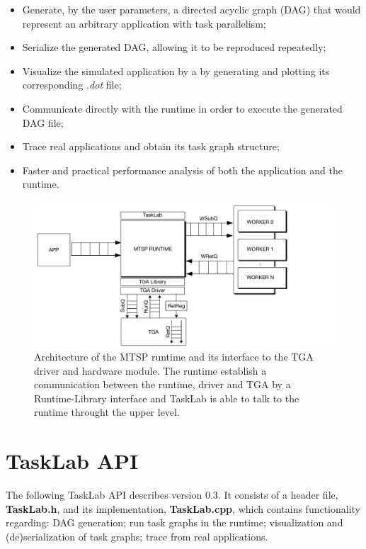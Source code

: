 \begin{itemize}
\item Generate, by the user parameters, a directed acyclic graph (DAG) that would represent an arbitrary application with task parallelism;
\item Serialize the generated DAG, allowing it to be reproduced repeatedly;
\item Visualize the simulated application by a by generating and plotting its corresponding \textit{.dot} file;
\item Communicate directly with the runtime in order to execute the generated DAG file;
\item Trace real applications and obtain its task graph structure;
\item Faster and practical performance analysis of both the application and the runtime.
\end{itemize}

\begin{figure}[ht!]
  \centering
  \includegraphics[width=12cm]{figures/MTSP-Driver.pdf}
  \caption{Architecture of the MTSP runtime and its interface to the TGA driver \cite{TIOGA} and hardware module. The runtime establish a communication between the runtime, driver and TGA by a Runtime-Library interface and TaskLab is able to talk to the runtime throught the upper level. }
  \label{fig:arch}
\end{figure}


\section{TaskLab API}
The following TaskLab API describes version 0.3. It consists of a header file, \textbf{TaskLab.h}, and its implementation, \textbf{TaskLab.cpp}, which contains functionality regarding: DAG generation; run task graphs in the runtime; visualization and (de)serialization of task graphs; trace from real applications.

